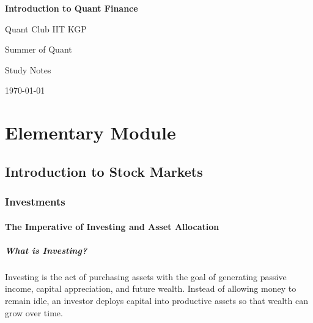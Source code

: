 \documentclass[12pt,openany]{book}
\begin{document}
\begin{titlepage}
    \centering
    \vspace*{2cm}

    {\Huge \textbf{Introduction to Quant Finance}\par}
    \vspace{0.8cm}
    {\Large Quant Club IIT KGP\par}
    \vspace{0.4cm}
    {\Large Summer of Quant\par}

    \vfill

    {\large Study Notes\par}
    \vspace{0.5cm}
    {\large \today\par}

    \vfill
\end{titlepage}


\tableofcontents

\part{Elementary Module}

\chapter{Introduction to Stock Markets}

\section{Investments}

\subsection{The Imperative of Investing and Asset Allocation}

\subsubsection{What is Investing?}
Investing is the act of purchasing assets with the goal of generating passive income, capital appreciation, and future wealth. Instead of allowing money to remain idle, an investor deploys capital into productive assets so that wealth can grow over time.
\end{document}
